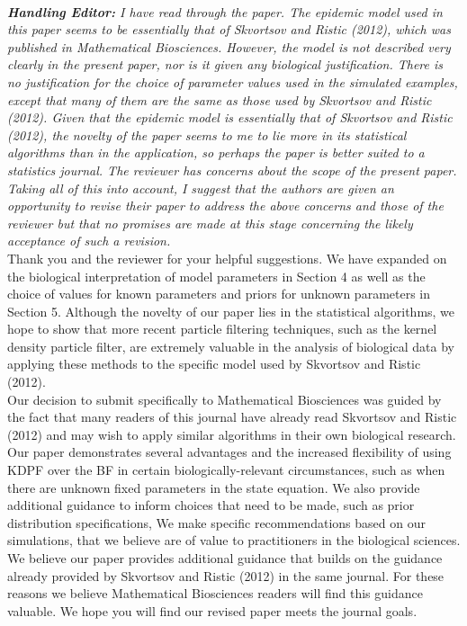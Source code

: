 \documentclass{article}
\begin{document}
 \\

\noindent \emph{{\bf Handling Editor:}  I have read through the paper.  The epidemic model used in this paper seems to be essentially that of Skvortsov and Ristic (2012), which was published in Mathematical Biosciences.  However, the model is not described very clearly in the present paper, nor is it given any biological justification.  There is no justification for the choice of parameter values used in the simulated examples, except that many of them are the same as those used by Skvortsov and Ristic (2012).  Given that the epidemic model is essentially that of Skvortsov and Ristic (2012), the novelty of the paper seems to me to lie more in its statistical algorithms than in the application, so perhaps the paper is better suited to a statistics journal.  The reviewer has concerns about the scope of the present paper.  Taking all of this into account, I suggest that the authors are given an opportunity to revise their paper to address the above concerns and those of the reviewer but that no promises are made at this stage concerning the likely acceptance of such a revision.} \\

Thank you and the reviewer for your helpful suggestions. We have expanded on the biological interpretation of model parameters in Section 4 as well as the choice of values for known parameters and priors for unknown parameters in Section 5. Although the novelty of our paper lies in the statistical algorithms, we hope to show that more recent particle filtering techniques, such as the kernel density particle filter, are extremely valuable in the analysis of biological data by applying these methods to the specific model used by Skvortsov and Ristic (2012). \\

Our decision to submit specifically to Mathematical Biosciences was guided by the fact that many readers of this journal have already read Skvortsov and Ristic (2012) and may wish to apply similar algorithms in their own biological research. Our paper demonstrates several advantages and the increased flexibility of using KDPF over the BF in certain biologically-relevant circumstances, such as when there are unknown fixed parameters in the state equation. We also provide additional guidance to inform choices that need to be made, such as prior distribution specifications, We make specific recommendations based on our simulations, that we believe are of value to practitioners in the biological sciences. We believe our paper provides additional guidance that builds on the guidance already provided by Skvortsov and Ristic (2012) in the same journal. For these reasons we believe Mathematical Biosciences readers will find this guidance valuable. We hope you will find our revised paper meets the journal goals. \\
\end{document}
